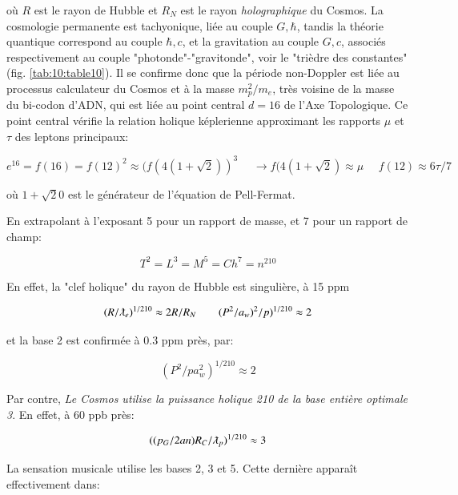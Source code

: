 \documentclass[a4paper,9pt]{article}
\newcounter{row}
\begin{document}
où $R$ est le rayon de Hubble et $ R_N$ est le rayon \textit{holographique} du Cosmos. 
La cosmologie permanente est tachyonique, liée au couple $G,\hbar$, tandis la théorie quantique correspond au couple $\hbar,c$, et la gravitation au couple $G,c$, associés respectivement au couple "photonde"-"gravitonde", voir le "trièdre des constantes" (fig. \ref{tab:10:table10}).
Il se confirme donc que la période non-Doppler est liée au processus calculateur du Cosmos et à la masse $m_p^2/m_e $, très voisine de la masse du bi-codon d'ADN, qui est liée au point central $d=16$ de l'Axe Topologique. Ce point central vérifie la relation holique képlerienne approximant les rapports $\mu$ et $\tau$ des leptons principaux:

\begin{equation}
e^{16} = f(16) = f(12)^2 \approx (f(4(1+\sqrt 2))^3 ~~~~~~ \rightarrow  f(4(1+\sqrt 2) \approx \mu ~~~~~~ f(12) \approx 6\tau/7
 \end{equation}

où $1+\sqrt 20$ est le générateur de l'équation de Pell-Fermat.

En extrapolant à l'exposant 5 pour un rapport de masse, et 7 pour un rapport de champ:

\begin{equation}
T^2 = L^3 = M^5 = Ch^7 = n^{210}
 \end{equation}
 
 En effet, la "clef holique" du rayon de Hubble est singulière, à 15 ppm 

\begin{equation}
(R/\lambdabar_e)^{1/210} \approx 2R/R_N ~~~~~~~~ (P^2/a_w)^2/p)^{1/210}\approx 2                      
 \end{equation}

et la base 2 est confirmée à 0.3 ppm près, par:

\begin{equation}
(P^2/pa_w^2)^{1/210}\approx 2                      
 \end{equation}

Par contre, \textit{Le Cosmos utilise la puissance holique 210 de la base entière optimale 3}. En effet, à 60 ppb près:

\begin{equation}
((p_G/2an) R_C/\lambdabar_p)^{1/210} \approx 3
 \end{equation}
 
 La sensation musicale utilise les bases 2, 3 et 5. Cette dernière apparaît effectivement dans:
 
\end{document}
